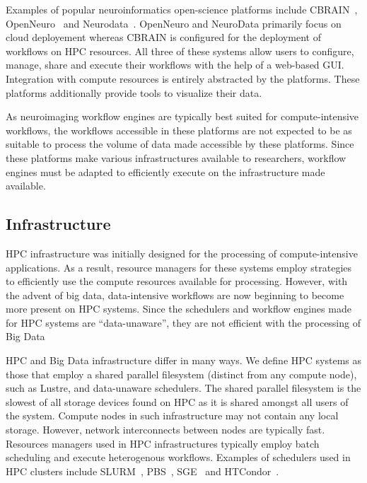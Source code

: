             Examples of popular neuroinformatics open-science platforms include
            CBRAIN~\cite{10.3389/fninf.2014.00054},
            OpenNeuro~\cite{gorgolewski2017openneuro} and
            Neurodata~\cite{burns2018community}. OpenNeuro and NeuroData
            primarily focus on cloud deployement whereas CBRAIN is configured
            for the deployment of workflows on HPC resources. All three of these
            systems allow users to configure, manage, share and execute their
            workflows with the help of a web-based GUI. Integration with compute
            resources is entirely abstracted by the platforms. These platforms
            additionally provide tools to visualize their data.

            As neuroimaging workflow engines are typically best suited for
            compute-intensive workflows, the workflows accessible in these
            platforms are not expected to be as suitable to process the volume
            of data made accessible by these platforms. Since these platforms
            make various infrastructures available to researchers, workflow
            engines must be adapted to efficiently execute on the infrastructure
            made available.
            
        \subsection{Infrastructure}\label{infrastructure} HPC infrastructure was
            initially designed for the processing of compute-intensive
            applications. As a result, resource managers for these systems
            employ strategies to efficiently use the compute resources available
            for processing. However, with the advent of big data, data-intensive
            workflows are now beginning to become more present on HPC systems.
            Since the schedulers and workflow engines made for HPC systems are
            ``data-unaware'', they are not efficient with the processing of Big
            Data

            HPC and Big Data infrastructure differ in many ways. We define HPC
            systems as those that employ a shared parallel filesystem (distinct
            from any compute node), such as Lustre, and data-unaware schedulers.
            The shared parallel filesystem is the slowest of all storage devices
            found on HPC as it is shared amongst all users of the system.
            Compute nodes in such infrastructure may not contain any local
            storage. However, network interconnects between nodes are typically
            fast. Resources managers used in HPC infrastructures typically
            employ batch scheduling and execute heterogenous workflows. Examples
            of schedulers used in HPC clusters include
            SLURM~\cite{yoo2003slurm}, PBS~\cite{10.1007/3-540-60153-8_34},
            SGE~\cite{SGE} and HTCondor~\cite{htcondor}.

